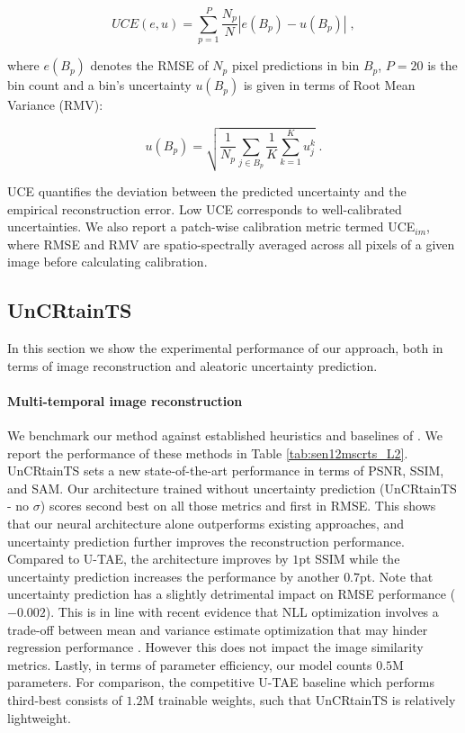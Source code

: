 \documentclass[10pt,twocolumn,letterpaper]{article}
\newcommand{\tabref}[1]{ Table \ref{#1}}
\begin{document}
\begin{equation}
UCE(e,u) = \sum_{p=1}^P \frac{N_p}{N} |e(B_p) - u(B_p)| \;,
\end{equation}\label{eq:UCE}

where $e(B_p)$ denotes the RMSE of $N_p$ pixel predictions in bin $B_p$, $P=20$ is the bin count and a bin's uncertainty $u(B_p)$ is given in terms of Root Mean Variance (RMV):

\begin{equation}
u(B_p) = \sqrt{\frac{1}{N_p } \sum_{j \in B_p}\frac{1}{K}  \sum_{k=1}^K u_j^k} \;.
\end{equation}\label{eq:RMV}

UCE quantifies the deviation between the predicted uncertainty and the empirical reconstruction error. Low UCE corresponds to well-calibrated uncertainties. We also report a patch-wise calibration metric termed UCE$_{im}$, where RMSE and RMV are spatio-spectrally averaged across all pixels of a given image before calculating calibration.

\subsection{UnCRtainTS} 
\label{subsection:eval_reconstruct}
In this section we show the experimental performance of our approach, both in terms of image reconstruction and aleatoric uncertainty prediction.




\paragraph{\bf Multi-temporal image reconstruction} We benchmark our method against established  heuristics and baselines of \cite{meraner2020cloud, Sarukkai_Jain_Uzkent_Ermon_2019, ebel2022sen12ms, garnot2021panoptic}.
We report the performance of these methods in \tabref{tab:sen12mscrts_L2}. UnCRtainTS sets a new state-of-the-art performance in terms of PSNR, SSIM, and SAM. Our architecture trained without uncertainty prediction (UnCRtainTS - no $\sigma$) scores second best on all those metrics and first in RMSE. This shows that our neural architecture alone  outperforms existing approaches, and uncertainty prediction further improves the reconstruction performance. Compared to U-TAE, the architecture improves by $1$pt SSIM while the uncertainty prediction increases the performance by another $0.7$pt. Note that uncertainty prediction has a slightly detrimental impact on RMSE performance ($-0.002$). This is in line with recent evidence that NLL optimization involves a trade-off between mean and variance estimate optimization that may hinder regression performance \cite{skafte2019reliable, seitzer2021pitfalls}. However this does not impact the image similarity metrics. Lastly, in terms of parameter efficiency, our model counts $0.5$M parameters. For comparison, the competitive U-TAE baseline \cite{garnot2021panoptic} which performs third-best consists of $1.2$M trainable weights, such that UnCRtainTS is relatively lightweight.
\end{document}
